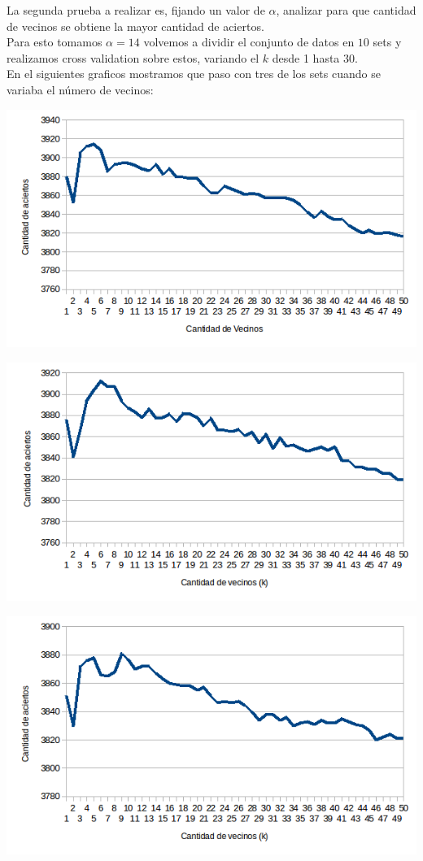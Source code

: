 La segunda prueba a realizar es, fijando un valor de $\alpha$, analizar para que cantidad de vecinos se obtiene la mayor cantidad de aciertos.
\\
Para esto tomamos $\alpha = 14$ volvemos a dividir el conjunto de datos en $10$ sets y realizamos cross validation sobre estos, variando el $k$ desde 1 hasta $30$.
\\
En el siguientes graficos mostramos que paso con tres de los sets cuando se variaba el número de vecinos:
\begin{center}
\includegraphics[scale=0.6]{nuevosResultados/pca/k/1.png}\\
\end{center}
\begin{center}
\includegraphics[scale=0.6]{nuevosResultados/pca/k/2.png}\\
\end{center}
\begin{center}
\includegraphics[scale=0.6]{nuevosResultados/pca/k/3.png}\\
\end{center}

